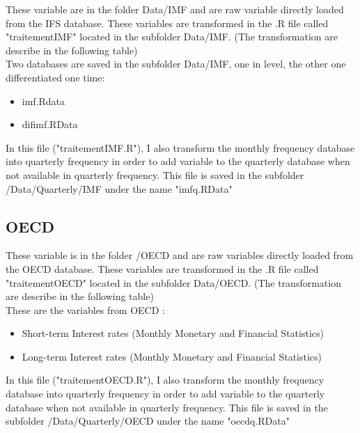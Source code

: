 \documentclass[11pt,a4paper]{article}
\begin{document}
\vspace{0.5cm}

These variable are in the folder Data/IMF and are raw variable directly loaded from the IFS database. These variables are transformed in the .R file called "traitementIMF" located in the subfolder Data/IMF. (The transformation are describe in the following table) \\

Two databases are saved in the subfolder Data/IMF, one in level, the other one differentiated one time: 

\begin{itemize}
\item imf.Rdata 
\item difimf.RData 
\end{itemize}

\vspace{0.5cm}

In this file ("traitementIMF.R"), I also transform the monthly frequency database into quarterly  frequency in order to add variable to the quarterly database when not available in quarterly frequency. This file is saved in the subfolder /Data/Quarterly/IMF under the name "imfq.RData" 






\subsection{OECD}

These variable is in the folder /OECD and are raw variables directly loaded from the OECD database.  These variables are transformed in the .R file called "traitementOECD" located in the subfolder Data/OECD. (The transformation are describe in the following table) \\


These are the variables from OECD :
\begin{itemize}
\item Short-term Interest rates (Monthly Monetary and Financial Statistics)
\item Long-term Interest rates (Monthly Monetary and Financial Statistics)
\end{itemize}

\vspace{0.5cm}

In this file ("traitementOECD.R"), I also transform the monthly frequency database into quarterly  frequency in order to add variable to the quarterly database when not available in quarterly frequency. This file is saved in the subfolder /Data/Quarterly/OECD under the name "oecdq.RData" 
\end{document}
